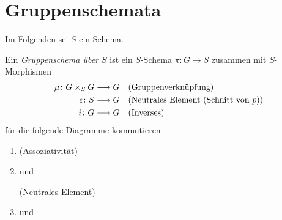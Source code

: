 \documentclass[german]{scrreprt}
\begin{document}
\section{Gruppenschemata}
Im Folgenden sei $S$ ein Schema.
\begin{Definition}[$S$"=Gruppenschema]
  Ein \emph{Gruppenschema über $S$} ist ein
  $S$-Schema $\pi\colon G\to S$ zusammen mit $S$-Morphismen
  \begin{align*}
    \mu\colon G\times_S G &\longrightarrow G
    &&\text{(Gruppenverknüpfung)}\\
    \epsilon\colon S&\longrightarrow G 
    &&\text{(Neutrales Element (Schnitt von $p$))}\\
    i\colon G &\longrightarrow G    
    &&\text{(Inverses)}
  \end{align*}
  für die folgende Diagramme kommutieren
  \begin{enumerate}[label=(\alph*)]
  \item
    \hfill(Assoziativität)
  \item
    und
    \hfill(Neutrales Element)
  \item
    und
\end{enumerate}
\end{Definition}
\end{document}
